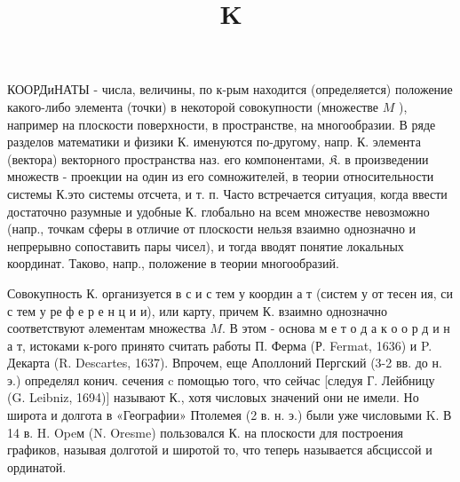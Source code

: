 \documentclass[10pt]{article}
\title{$\mathbf{K}$ }
\author{}
\date{}
\begin{document}
\maketitle

КООРДиНАТЫ - числа, величины, по к-рым находится (определяется) положение какого-либо элемента (точки) в некоторой совокупности (множестве $M$ ), например на плоскости поверхности, в пространстве, на многообразии. В ряде разделов математики и физики К. именуются по-другому, напр. К. элемента (вектора) векторного пространства наз. его компонентами, $\mathfrak{K}$. в произведении множеств - проекции на один из его сомножителей, в теории относительности системы К.это системы отсчета, и т. п. Часто встречается ситуация, когда ввести достаточно разумные и удобные К. глобально на всем множестве невозможно (напр., точкам сферы в отличие от плоскости нельзя взаимно однозначно и непрерывно сопоставить пары чисел), и тогда вводят понятие локальных координат. Таково, напр., положение в теории многообразий.



Совокупность К. организуется в с и с тем у координ а т (систем у от тесен ия, си с тем у ре ф е р е н ц и и), или карту, причем К. взаимно однозначно соответствуют әлементам множества $M$. В этом - основа м е т о д а к о о р д и н а т, истоками к-рого принято считать работы П. Ферма (Р. Fermat, 1636) и P. Декарта (R. Descartes, 1637). Впрочем, еще Аполлоний Пергский (3-2 вв. до н. э.) определял конич. сечения $\mathrm{c}$ помощью того, что сейчас [следуя Г. Лейбницу (G. Leibniz, 1694)] называют К., хотя числовых значений они не имели. Но широта и долгота в «Географии» Птолемея (2 в. н. э.) были уже числовыми K. В 14 в. H. Opeм (N. Oresme) пользовался К. на плоскости для построения графиков, называя долготой и широтой то, что теперь называется абсциссой и ординатой.
\end{document}
